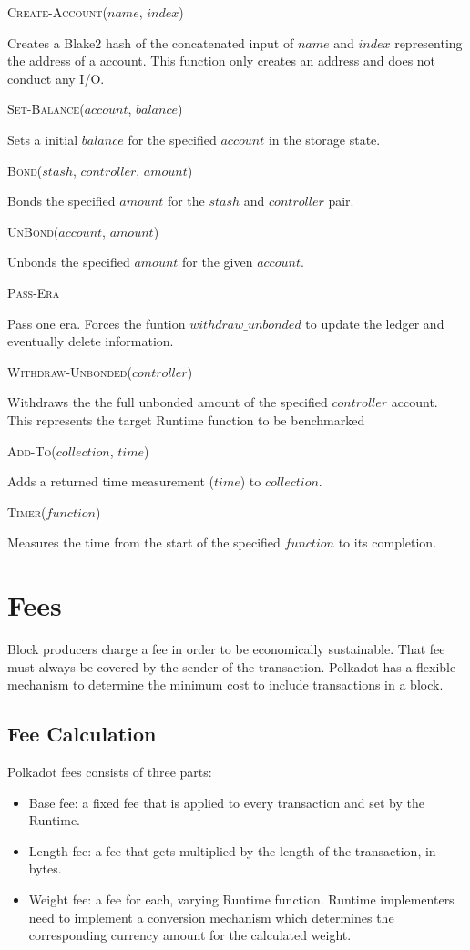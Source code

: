 \documentclass[11pt,a4paper]{article}
\newcommand{\SubItem}[1]{
    {\setlength\itemindent{15pt} \item[-] #1}
}
\begin{document}
\begin{itemize}
  \item \textsc{Create-Account($name$, $index$)} \SubItem{Creates a Blake2 hash
    of the concatenated input of $name$ and $index$ representing the address of
    a account. This function only creates an address and does not conduct any
    I/O.}
  \item \textsc{Set-Balance($account$, $balance$)} \SubItem{Sets a initial
      $balance$ for the specified $account$ in the storage state.}
  \item \textsc{Bond($stash$, $controller$, $amount$)} \SubItem{Bonds the
    specified $amount$ for the $stash$ and $controller$ pair.}
  \item \textsc{UnBond($account$, $amount$)} \SubItem{Unbonds the specified
    $amount$ for the given $account$.}
  \item \textsc{Pass-Era}
  \SubItem{Pass one era. Forces the funtion $withdraw\_unbonded$ to update the ledger
  and eventually delete information.}
  \item \textsc{Withdraw-Unbonded($controller$)} \SubItem{Withdraws the the full
    unbonded amount of the specified $controller$ account. This represents the
    target Runtime function to be benchmarked}
  \item \textsc{Add-To($collection$, $time$)} \SubItem{Adds a returned time
    measurement ($time$) to $collection$.}
  \item \textsc{Timer($function$)} \SubItem{Measures the time from the start of
    the specified $function$ to its completion.}
\end{itemize}

\section{Fees}
Block producers charge a fee in order to be economically sustainable. That fee
must always be covered by the sender of the transaction. Polkadot has a flexible
mechanism to determine the minimum cost to include transactions in a block.

\subsection{Fee Calculation}\label{sec:fee-calculation}
Polkadot fees consists of three parts:

\begin{itemize}
\item Base fee: a fixed fee that is applied to every transaction and set by the
Runtime.
\item Length fee: a fee that gets multiplied by the length of the transaction,
in bytes.
\item Weight fee: a fee for each, varying Runtime function. Runtime implementers
      need to implement a conversion mechanism which determines the
      corresponding currency amount for the calculated weight.
\end{itemize}
\end{document}
